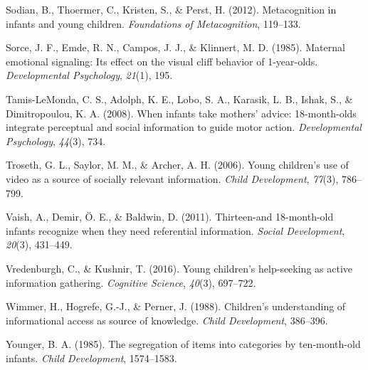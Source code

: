 \documentclass[floatsintext,man]{apa6}
\theoremstyle{definition}
\theoremstyle{definition}
\theoremstyle{definition}
\theoremstyle{remark}
\begin{document}
\hypertarget{ref-sodian2012metacognition}{}
Sodian, B., Thoermer, C., Kristen, S., \& Perst, H. (2012).
Metacognition in infants and young children. \emph{Foundations of
Metacognition}, 119--133.

\hypertarget{ref-sorce1985maternal}{}
Sorce, J. F., Emde, R. N., Campos, J. J., \& Klinnert, M. D. (1985).
Maternal emotional signaling: Its effect on the visual cliff behavior of
1-year-olds. \emph{Developmental Psychology}, \emph{21}(1), 195.

\hypertarget{ref-tamis2008infants}{}
Tamis-LeMonda, C. S., Adolph, K. E., Lobo, S. A., Karasik, L. B., Ishak,
S., \& Dimitropoulou, K. A. (2008). When infants take mothers' advice:
18-month-olds integrate perceptual and social information to guide motor
action. \emph{Developmental Psychology}, \emph{44}(3), 734.

\hypertarget{ref-troseth2006young}{}
Troseth, G. L., Saylor, M. M., \& Archer, A. H. (2006). Young children's
use of video as a source of socially relevant information. \emph{Child
Development}, \emph{77}(3), 786--799.

\hypertarget{ref-vaish2011thirteen}{}
Vaish, A., Demir, Ö. E., \& Baldwin, D. (2011). Thirteen-and
18-month-old infants recognize when they need referential information.
\emph{Social Development}, \emph{20}(3), 431--449.

\hypertarget{ref-vredenburgh2016young}{}
Vredenburgh, C., \& Kushnir, T. (2016). Young children's help-seeking as
active information gathering. \emph{Cognitive Science}, \emph{40}(3),
697--722.

\hypertarget{ref-wimmer1988children}{}
Wimmer, H., Hogrefe, G.-J., \& Perner, J. (1988). Children's
understanding of informational access as source of knowledge.
\emph{Child Development}, 386--396.

\hypertarget{ref-younger1985segregation}{}
Younger, B. A. (1985). The segregation of items into categories by
ten-month-old infants. \emph{Child Development}, 1574--1583.
\end{document}
